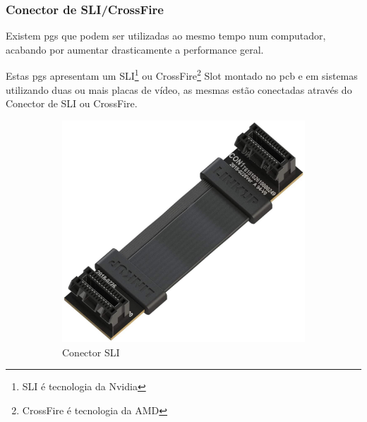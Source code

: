 \documentclass{report}
\begin{document}
\subsubsection{Conector de SLI/CrossFire}
Existem \acp{pg} que podem ser utilizadas ao mesmo tempo num computador, acabando por aumentar drasticamente a performance geral.

Estas \acp{pg} apresentam um SLI\footnote{SLI é tecnologia da Nvidia} ou CrossFire\footnote{CrossFire é tecnologia da AMD} Slot montado no \ac{pcb}
e em sistemas utilizando duas ou mais placas de vídeo, as mesmas estão conectadas através do Conector de SLI ou CrossFire.


\begin{figure}[h]
     \centering
     \begin{subfigure}[h]{0.3\textwidth}
         \centering
         \includegraphics[width=\textwidth]{sli.jpg}
         \caption{Conector SLI}
         \label{fig:sli}
     \end{subfigure}
     \hfill
     \begin{subfigure}[h]{0.3\textwidth}
         \centering

\end{subfigure}
\end{figure}
\end{document}
